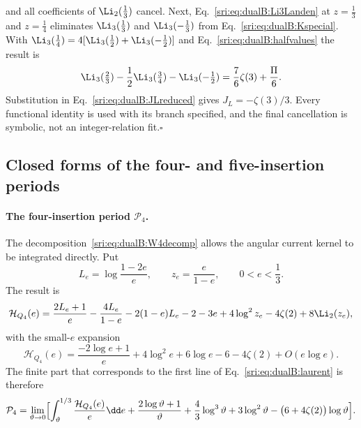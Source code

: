 and all coefficients of $\Li_2(\frac13)$ cancel. Next, Eq.~\eqref{sri:eq:dualB:Li3Landen} at $z=\frac13$ and $z=\frac14$
eliminates $\Li_3(\frac13)$ and $\Li_3(-\frac13)$ from Eq.~\eqref{sri:eq:dualB:Kspecial}. With
$\Li_3(\frac14)=4[\Li_3(\frac12)+\Li_3(-\frac12)]$ and Eq.~\eqref{sri:eq:dualB:halfvalues} the result is
\begin{equation}
 \Li_3(\tfrac23)-\frac12\Li_3(\tfrac34)-\Li_3(-\tfrac12)=\frac76\zeta(3)+\frac\Pi6.
 \label{sri:eq:dualB:keycombination}
\end{equation}
Substitution in Eq.~\eqref{sri:eq:dualB:JLreduced} gives $J_L=-\zeta(3)/3$. Every functional identity is used with its
branch specified, and the final cancellation is symbolic, not an integer-relation fit.\hfill$\square$

\subsection{Closed forms of the four- and five-insertion periods}\label{sri:app:dualB:periods}
\paragraph{The four-insertion period $\mathcal P_4$.} The decomposition~\eqref{sri:eq:dualB:W4decomp} allows the angular
current kernel to be integrated directly. Put
\begin{equation}
 L_e=\log\frac{1-2e}{e},\qquad z_e=\frac e{1-e},\qquad 0<e<\frac13.
\end{equation}
The result is
\begin{equation}
 \mathcal H_{Q_4}(e)=\frac{2L_e+1}{e}-\frac{4L_e}{1-e}-2(1-e)L_e-2-3e+4\log^2z_e-4\zeta(2)+8\Li_2(z_e),
 \label{sri:eq:dualB:HQexact}
\end{equation}
with the small-$e$ expansion
\begin{equation}
 \mathcal H_{Q_4}(e)=\frac{-2\log e+1}{e}+4\log^2e+6\log e-6-4\zeta(2)+O(e\log e).
\end{equation}
The finite part that corresponds to the first line of Eq.~\eqref{sri:eq:dualB:laurent} is therefore
\begin{equation}
 \mathcal P_4=\lim_{\vartheta\to0}\Bigl[\int_\vartheta^{1/3}\frac{\mathcal H_{Q_4}(e)}{e}\dd e+\frac{2\log\vartheta+1}{\vartheta}
 +\frac43\log^3\vartheta+3\log^2\vartheta-\bigl(6+4\zeta(2)\bigr)\log\vartheta\Bigr].
 \label{sri:eq:dualB:Pfinitepart}
\end{equation}

